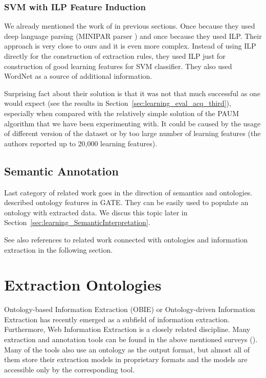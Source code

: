 \subsubsection{SVM with ILP Feature Induction}

We already mentioned the work of \cite{DBLP:conf/ilp/RamakrishnanJBS07} in previous sections. Once because they used deep language parsing (MINIPAR parser \citep{minipar}) and once because they used ILP. Their approach is very close to ours and it is even more complex. Instead of using ILP directly for the construction of extraction rules, they used ILP just for construction of good learning features for SVM classifier. They also used WordNet as a source of additional information. 

Surprising fact about their solution is that it was not that much successful as one would expect (see the results in Section~\ref{sec:learning_eval_acq_third}), especially when compared with the relatively simple solution of the PAUM algorithm that we have been experimenting with. It could be caused by the usage of different version of the dataset or by too large number of learning features (the authors reported up to 20,000 learning features).


\subsection{Semantic Annotation}
Last category of related work goes in the direction of semantics and ontologies. \cite{Bon04b} described  ontology features in GATE. They can be easily used to populate an ontology with extracted data. We discus this topic later in Section~\ref{sec:learning_SemanticInterpretation}.

See also references to related work connected with ontologies and information extraction in the following section. 


\section{Extraction Ontologies} \label{sec:relwork_ext_ont}

Ontology-based Information Extraction (OBIE) \citep{citeulike:7291004} or Ontology-driven Information Extraction \citep{Yildiz:2007:OMO:1793154.1793216} has recently emerged as a subfield of information extraction. Furthermore, Web Information Extraction \citep{biblio:Survey_of_Web_Information_Extraction_Systems} is a closely related discipline. Many extraction and annotation tools can be found in the above mentioned surveys (\cite{biblio:Survey_of_Web_Information_Extraction_Systems}). Many of the tools also use an ontology as the output format, but almost all of them store their extraction models in proprietary formats and the models are accessible only by the corresponding tool.

